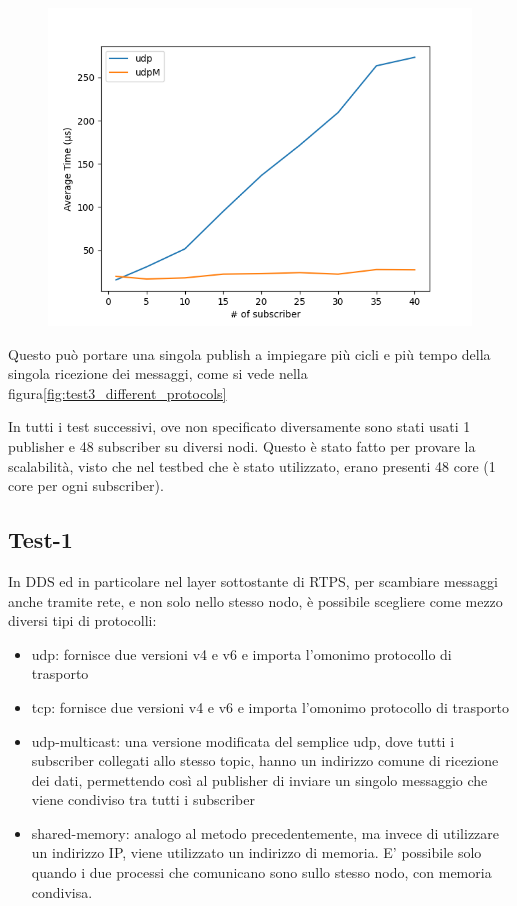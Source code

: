 \begin{figure}[H]
    \includegraphics[width=\textwidth]{./results/test3_udpvsudpM.png} 
        \caption{} %
        \label{}
\end{figure}

Questo può portare una singola publish a impiegare più cicli e più tempo della singola ricezione dei messaggi, come si vede nella figura\ref{fig:test3_different_protocols}

In tutti i test successivi, ove non specificato diversamente sono stati usati 1 publisher e 48 subscriber su diversi nodi. Questo è stato fatto per provare la scalabilità, visto che nel testbed che è stato utilizzato, erano presenti 48 core (1 core per ogni subscriber).

\subsection{Test-1}
In DDS ed in particolare nel layer sottostante di RTPS, per scambiare messaggi anche tramite rete, e non solo nello stesso nodo, è possibile scegliere come mezzo diversi tipi di protocolli:

\begin{itemize}
    \item udp: fornisce due versioni v4 e v6 e importa l'omonimo protocollo di trasporto
    \item tcp: fornisce due versioni v4 e v6 e importa l'omonimo protocollo di trasporto
    \item udp-multicast: una versione modificata del semplice udp, dove tutti i subscriber collegati allo stesso topic, hanno un indirizzo comune di ricezione dei dati, permettendo così al publisher di inviare un singolo messaggio che viene condiviso tra tutti i subscriber  %
    \item shared-memory: analogo al metodo precedentemente, ma invece di utilizzare un indirizzo IP, viene utilizzato un indirizzo di memoria. E' possibile solo quando i due processi che comunicano sono sullo stesso nodo, con memoria condivisa.
\end{itemize}

